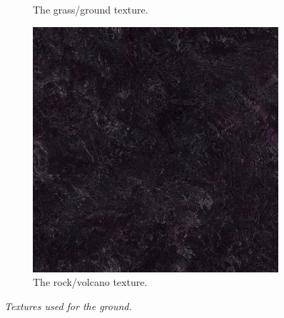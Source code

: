 \begin{figure}[H]
\begin{subfigure}{.32\textwidth}
  \caption{The grass/ground texture.}
  \label{fig:textureGrass}
\end{subfigure}
\begin{subfigure}{.32\textwidth}
  \centering
  \includegraphics[width=0.9\linewidth]{images/textureRock.jpg}
  \caption{The rock/volcano texture.}
  \label{fig:textureRock}
\end{subfigure}
\caption[Ground textures]{\textit{Textures used for the ground.}}
\label{fig:textures}
\end{figure}


